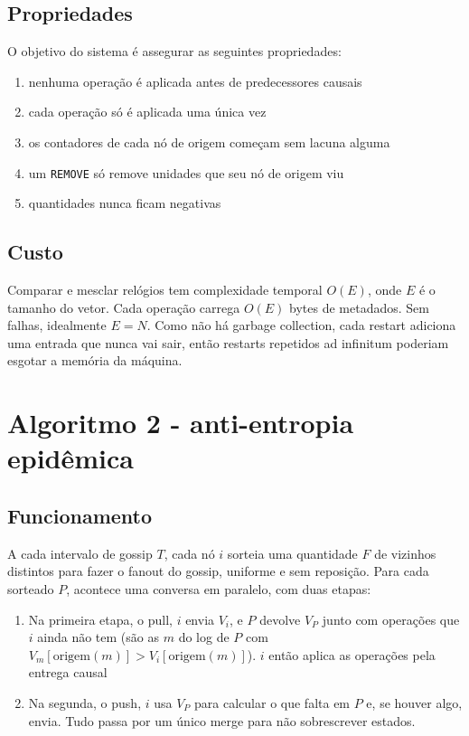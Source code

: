\documentclass[conference,a4paper]{IEEEtran}
\begin{document}
\subsection{Propriedades}
O objetivo do sistema é assegurar as seguintes propriedades:
\begin{enumerate}
    \item nenhuma operação é aplicada antes de predecessores causais
    \item cada operação só é aplicada uma única vez
    \item os contadores de cada nó de origem começam sem lacuna alguma
    \item um \texttt{REMOVE} só remove unidades que seu nó de origem viu
    \item quantidades nunca ficam negativas
\end{enumerate}

\subsection{Custo}
Comparar e mesclar relógios tem complexidade temporal $O(E)$, onde $E$ é o tamanho do vetor. Cada operação carrega $O(E)$ bytes de metadados. Sem falhas, idealmente $E = N$. Como não há garbage collection, cada restart adiciona uma entrada que nunca vai sair, então restarts repetidos ad infinitum poderiam esgotar a memória da máquina.

\section{Algoritmo 2 - anti-entropia epidêmica}\label{sec:alg2}
\subsection{Funcionamento}
A cada intervalo de gossip $T$, cada nó $i$ sorteia uma quantidade $F$ de vizinhos distintos para fazer o fanout do gossip, uniforme e sem reposição. Para cada sorteado $P$, acontece uma conversa em paralelo, com duas etapas:

\begin{enumerate}
    \item Na primeira etapa, o pull, $i$ envia $V_i$, e $P$ devolve $V_P$ junto com operações que $i$ ainda não tem (são as $m$ do log de $P$ com $V_m[\mathrm{origem}(m)] > V_i[\mathrm{origem}(m)]$). $i$ então aplica as operações pela entrega causal
    \item Na segunda, o push, $i$ usa $V_P$ para calcular o que falta em $P$ e, se houver algo, envia. Tudo passa por um único merge para não sobrescrever estados.
\end{enumerate}
\end{document}
